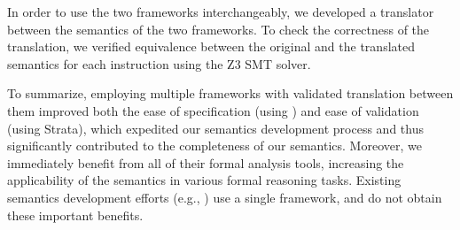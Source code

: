In order to use the two frameworks interchangeably, we developed a translator between the semantics of the two frameworks. To check the correctness of the translation, we verified equivalence between the original and the translated semantics for each instruction using the Z3 SMT solver.

To summarize, employing multiple frameworks with validated translation between them improved both the ease of specification (using \K) and ease of validation (using Strata), which expedited our semantics development process and thus significantly contributed to the completeness of our semantics. Moreover, we immediately benefit from all of their formal analysis tools, increasing the applicability of the semantics in various formal reasoning tasks. Existing semantics development efforts (e.g., \cite{Goel:FMCAD14,Heule2016a}) %
use a single framework, and do not obtain these important benefits.
%
